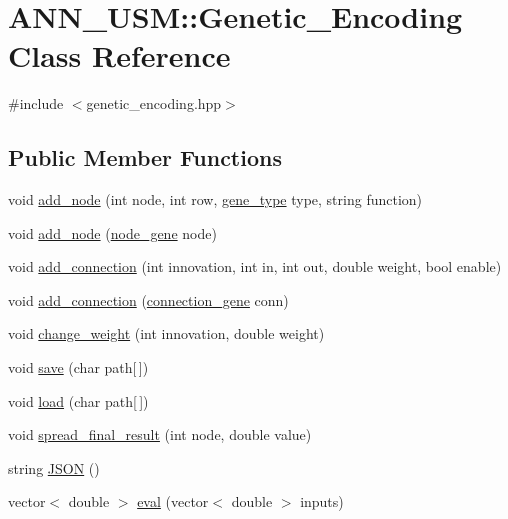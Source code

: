 \hypertarget{class_a_n_n___u_s_m_1_1_genetic___encoding}{\section{A\-N\-N\-\_\-\-U\-S\-M\-:\-:Genetic\-\_\-\-Encoding Class Reference}
\label{class_a_n_n___u_s_m_1_1_genetic___encoding}
}


{\ttfamily \#include $<$genetic\-\_\-encoding.\-hpp$>$}

\subsection*{Public Member Functions}
\begin{DoxyCompactItemize}
\item 
void \hyperlink{class_a_n_n___u_s_m_1_1_genetic___encoding_a1451a90f4672e672dc559f6f5f78a9f0}{add\-\_\-node} (int node, int row, \hyperlink{namespace_a_n_n___u_s_m_aa7f97f486244dd898592ba14dd7aa778}{gene\-\_\-type} type, string function)
\item 
void \hyperlink{class_a_n_n___u_s_m_1_1_genetic___encoding_aee703abc7c6549f4b1d8f6c968ade23d}{add\-\_\-node} (\hyperlink{class_a_n_n___u_s_m_1_1node__gene}{node\-\_\-gene} node)
\item 
void \hyperlink{class_a_n_n___u_s_m_1_1_genetic___encoding_a4e46296d0531840686d8a0e6927c3eae}{add\-\_\-connection} (int innovation, int in, int out, double weight, bool enable)
\item 
void \hyperlink{class_a_n_n___u_s_m_1_1_genetic___encoding_a58aae26273d906a268974b3e32e830eb}{add\-\_\-connection} (\hyperlink{class_a_n_n___u_s_m_1_1connection__gene}{connection\-\_\-gene} conn)
\item 
void \hyperlink{class_a_n_n___u_s_m_1_1_genetic___encoding_a10660e165ed513e7e19cee375ea7de88}{change\-\_\-weight} (int innovation, double weight)
\item 
void \hyperlink{class_a_n_n___u_s_m_1_1_genetic___encoding_a4b008853b6cdb594f932d3d2fd8679dd}{save} (char path\mbox{[}$\,$\mbox{]})
\item 
void \hyperlink{class_a_n_n___u_s_m_1_1_genetic___encoding_aa02f2917484681f2ea7de654c8de1ed4}{load} (char path\mbox{[}$\,$\mbox{]})
\item 
void \hyperlink{class_a_n_n___u_s_m_1_1_genetic___encoding_ab861af85462942c5238567496fe6def0}{spread\-\_\-final\-\_\-result} (int node, double value)
\item 
string \hyperlink{class_a_n_n___u_s_m_1_1_genetic___encoding_a6e047636ec1196cba5d6240ff2dd589f}{J\-S\-O\-N} ()
\item 
vector$<$ double $>$ \hyperlink{class_a_n_n___u_s_m_1_1_genetic___encoding_a31b9ed6ea6134b1ddc27446575e69d1a}{eval} (vector$<$ double $>$ inputs)
\end{DoxyCompactItemize}
